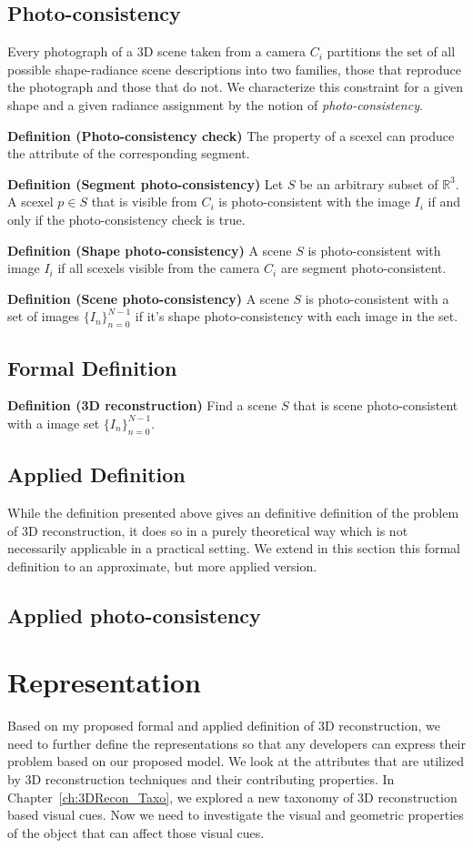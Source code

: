 \subsection{Photo-consistency}
Every photograph of a 3D scene taken from a camera $C_i$ partitions the set of all possible shape-radiance scene descriptions into two families, those that reproduce the photograph and those that do not. We characterize this constraint for a given shape and a given radiance assignment by the notion of \textit{photo-consistency}.

\textbf{Definition (Photo-consistency check)} The property of a scexel can produce the attribute of the corresponding segment. 

\textbf{Definition (Segment photo-consistency)} Let $S$ be an arbitrary subset of $\mathbb{R}^3$. A scexel $p\in S$ that is visible from $C_i$ is photo-consistent with the image $I_i$ if and only if the photo-consistency check is true.

\textbf{Definition (Shape photo-consistency)} A scene $S$ is photo-consistent with image $I_i$ if all scexels visible from the camera $C_i$ are segment photo-consistent.

\textbf{Definition (Scene photo-consistency)} A scene $S$ is photo-consistent with a set of images $\{I_n\}_{n=0}^{N-1}$ if it's shape photo-consistency with each image in the set.

\subsection{Formal Definition}
\textbf{Definition (3D reconstruction)} Find a scene $S$ that is scene photo-consistent with a image set $\{I_n\}_{n=0}^{N-1}$.

\subsection{Applied Definition}
While the definition presented above gives an definitive definition of the problem of 3D reconstruction, it does so in a purely theoretical way which is not necessarily applicable in a practical setting. We extend in this section this formal definition to an approximate, but more applied version.

\subsection{Applied photo-consistency}


\section{Representation}
Based on my proposed formal and applied definition of 3D reconstruction, we need to further define the representations so that any developers can express their problem based on our proposed model. We look at the attributes that are utilized by 3D reconstruction techniques and their contributing properties. In Chapter~\ref{ch:3DRecon_Taxo}, we explored a new taxonomy of 3D reconstruction based visual cues. Now we need to investigate the visual and geometric properties of the object that can affect those visual cues.

